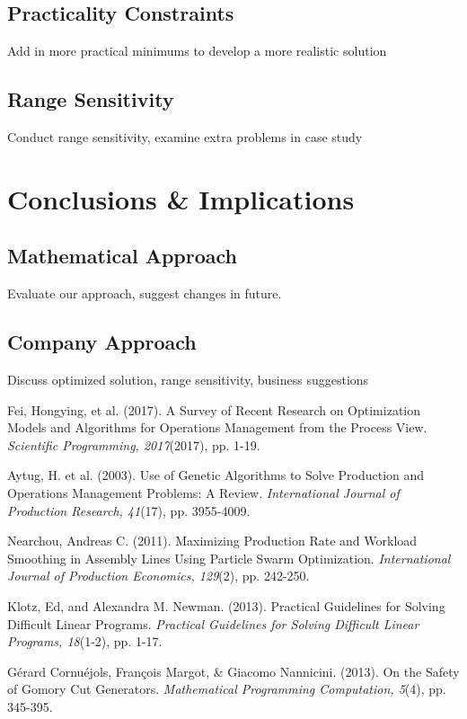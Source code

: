 \documentclass{article}
\begin{document}
\subsection{Practicality Constraints}
Add in more practical minimums to develop a more realistic solution
\subsection{Range Sensitivity}
Conduct range sensitivity, examine extra problems in case study
\section{Conclusions \& Implications}
\subsection{Mathematical Approach}
Evaluate our approach, suggest changes in future.
\subsection{Company Approach}
Discuss optimized solution, range sensitivity, business suggestions
	\newpage
	\begin{thebibliography}{5}
	
Fei, Hongying, et al. (2017). A Survey of Recent Research on Optimization Models and Algorithms for Operations Management from the Process View. 
\textit{Scientific Programming, 2017}(2017), pp. 1-19.
	
Aytug, H. et al. (2003). Use of Genetic Algorithms to Solve Production and Operations Management Problems: A Review. 
\textit{International Journal of Production Research, 41}(17), pp. 3955-4009.

Nearchou, Andreas C. (2011). Maximizing Production Rate and Workload Smoothing in Assembly Lines Using Particle Swarm Optimization. 
\textit{International Journal of Production Economics, 129}(2), pp. 242-250.

Klotz, Ed, and Alexandra M. Newman. (2013). Practical Guidelines for Solving Difficult Linear Programs. 
\textit{Practical Guidelines for Solving Difficult Linear Programs, 18}(1-2), pp. 1-17.

G\'{e}rard Cornu\'{e}jols, Fran\c{c}ois Margot, \& Giacomo Nannicini. (2013). On the Safety of Gomory Cut Generators. 
\textit{Mathematical Programming Computation, 5}(4), pp. 345-395.


\end{thebibliography}
\end{document}
